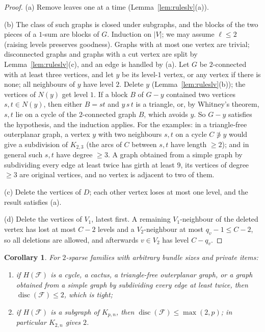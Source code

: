 \documentclass[11pt,letterpaper]{article}
\newtheorem{corollary}[theorem]{Corollary}
\theoremstyle{definition}
\newcommand{\cF}{\mathcal{F}}
\DeclareMathOperator{\disc}{disc}
\begin{document}
\begin{proof}
(a) Remove leaves one at a time (Lemma~\ref{lem:ruleslv}(a)).

(b) The class of such graphs is closed under subgraphs, and the blocks of the two pieces of a
$1$-sum are blocks of $G$. Induction on $|V|$; we may assume $\ell\le2$ (raising levels preserves
goodness). Graphs with at most one vertex are trivial; disconnected graphs and graphs with a cut
vertex are split by Lemma~\ref{lem:ruleslv}(c), and an edge is handled by (a). Let $G$ be
$2$-connected with at least three vertices, and let $y$ be its level-$1$ vertex, or any vertex if
there is none; all neighbours of $y$ have level $2$. Delete $y$ (Lemma~\ref{lem:ruleslv}(b)); the
vertices of $N(y)$ get level $1$. If a block $B$ of $G-y$ contained two vertices $s,t\in N(y)$, then
either $B=st$ and $y\,s\,t$ is a triangle, or, by Whitney's theorem, $s,t$ lie on a cycle of the
$2$-connected graph $B$, which avoids $y$. So $G-y$ satisfies the hypothesis, and the induction
applies. For the examples: in a triangle-free outerplanar graph, a vertex $y$ with two neighbours
$s,t$ on a cycle $C\not\ni y$ would give a subdivision of $K_{2,3}$ (the arcs of $C$ between $s,t$
have length $\ge2$); and in general such $s,t$ have degree $\ge3$. A graph obtained from a simple
graph by subdividing every edge at least twice has girth at least $9$, its vertices of degree $\ge3$
are original vertices, and no vertex is adjacent to two of them.

(c) Delete the vertices of $D$; each other vertex loses at most one level, and the result satisfies
(a).

(d) Delete the vertices of $V_1$, latest first. A remaining $V_1$-neighbour of the deleted vertex has
lost at most $C-2$ levels and a $V_2$-neighbour at most $q_v-1\le C-2$, so all deletions are
allowed, and afterwards $v\in V_2$ has level $C-q_v$.
\end{proof}

\begin{corollary}\label{cor:leveled}
For $2$-sparse families with arbitrary bundle sizes and private items:
\begin{enumerate}[label=(\roman*),itemsep=0pt]
\item if $H(\cF)$ is a cycle, a cactus, a triangle-free outerplanar graph, or a graph obtained from
a simple graph by subdividing every edge at least twice, then $\disc(\cF)\le2$, which is tight;
\item if $H(\cF)$ is a subgraph of $K_{p,n}$, then $\disc(\cF)\le\max(2,p)$; in particular $K_{2,n}$
gives $2$.
\end{enumerate}
\end{corollary}
\end{document}
